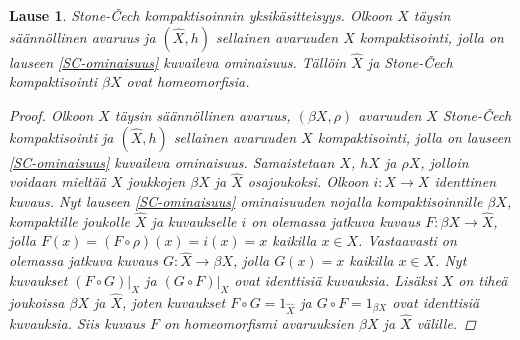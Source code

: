 \documentclass[12pt,a4paper,leqno]{report}
\theoremstyle{plain}
\newtheorem{lause}[equation]{Lause}
\theoremstyle{definition}
\theoremstyle{remark}
\begin{document}
\begin{lause}
Stone-Čech kompaktisoinnin yksikäsitteisyys. 
Olkoon $X$ täysin säännöllinen avaruus 
ja $(\hat{X},h)$ sellainen avaruuden $X$ kompaktisointi, 
jolla on lauseen \ref{SC-ominaisuus} kuvaileva ominaisuus. 
Tällöin $\hat{X} $ ja Stone-Čech kompaktisointi $\beta X$ ovat homeomorfisia. 
\begin{proof}
Olkoon $X$ täysin säännöllinen avaruus, 
$(\beta X,\rho)$ avaruuden $X$ Stone-Čech kompaktisointi 
ja $(\hat{X},h)$ sellainen avaruuden $X$ kompaktisointi, 
jolla on lauseen \ref{SC-ominaisuus} kuvaileva ominaisuus. 
Samaistetaan $X$, $hX$ ja $\rho X$, jolloin voidaan mieltää $X$ joukkojen $\beta X$ ja $\hat{X}$ osajoukoksi. 
Olkoon $i\colon X\rightarrow X$ identtinen kuvaus. 
Nyt lauseen \ref{SC-ominaisuus} ominaisuuden nojalla 
kompaktisoinnille $\beta X$, kompaktille joukolle $\hat{X}$ ja kuvaukselle $i$ 
on olemassa jatkuva kuvaus 
$F\colon\beta X\rightarrow \hat{X}$, 
jolla $F(x)=(F\circ\rho)(x)=i(x)=x$ kaikilla $x\in X$. 
Vastaavasti on olemassa jatkuva kuvaus $G\colon \hat{X}\rightarrow \beta X$,
jolla $G(x)=x$ kaikilla $x\in X$. 
Nyt kuvaukset $(F\circ G)\vert_X$ ja $(G\circ F)\vert_X$ ovat 
identtisiä kuvauksia. 
Lisäksi $X$ on tiheä joukoissa $\beta X$ ja $\hat{X}$, joten 
kuvaukset $F\circ G=1_{\hat{X}}$ ja $G\circ F=1_{\beta X}$ ovat identtisiä kuvauksia. 
Siis kuvaus $F$ on homeomorfismi avaruuksien $\beta X$ ja $\hat{X}$ välille.
\end{proof}
\end{lause}
\end{document}

